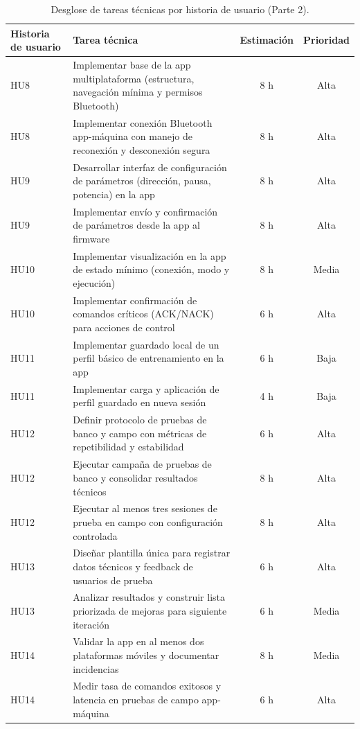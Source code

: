 ﻿\documentclass[
11pt, %
]{charter}
\begin{document}
\newpage
\begin{table}[htpb]
\centering
\caption{Desglose de tareas técnicas por historia de usuario (Parte 2).}
\begin{tabularx}{\linewidth}{@{}|X|X|c|c|@{}}
\hline
\rowcolor[HTML]{C0C0C0}
Historia de usuario & Tarea técnica & Estimación & Prioridad \\ \hline
HU8 & Implementar base de la app multiplataforma (estructura, navegación mínima y permisos Bluetooth) & 8 h & Alta \\ \hline
HU8 & Implementar conexión Bluetooth app-máquina con manejo de reconexión y desconexión segura & 8 h & Alta \\ \hline
HU9 & Desarrollar interfaz de configuración de parámetros (dirección, pausa, potencia) en la app & 8 h & Alta \\ \hline
HU9 & Implementar envío y confirmación de parámetros desde la app al firmware & 8 h & Alta \\ \hline
HU10 & Implementar visualización en la app de estado mínimo (conexión, modo y ejecución) & 8 h & Media \\ \hline
HU10 & Implementar confirmación de comandos críticos (ACK/NACK) para acciones de control & 6 h & Alta \\ \hline
HU11 & Implementar guardado local de un perfil básico de entrenamiento en la app & 6 h & Baja \\ \hline
HU11 & Implementar carga y aplicación de perfil guardado en nueva sesión & 4 h & Baja \\ \hline
HU12 & Definir protocolo de pruebas de banco y campo con métricas de repetibilidad y estabilidad & 6 h & Alta \\ \hline
HU12 & Ejecutar campaña de pruebas de banco y consolidar resultados técnicos & 8 h & Alta \\ \hline
HU12 & Ejecutar al menos tres sesiones de prueba en campo con configuración controlada & 8 h & Alta \\ \hline
HU13 & Diseñar plantilla única para registrar datos técnicos y feedback de usuarios de prueba & 6 h & Alta \\ \hline
HU13 & Analizar resultados y construir lista priorizada de mejoras para siguiente iteración & 6 h & Media \\ \hline
HU14 & Validar la app en al menos dos plataformas móviles y documentar incidencias & 8 h & Media \\ \hline
HU14 & Medir tasa de comandos exitosos y latencia en pruebas de campo app-máquina & 6 h & Alta \\ \hline
\end{tabularx}
\end{table}
\end{document}
